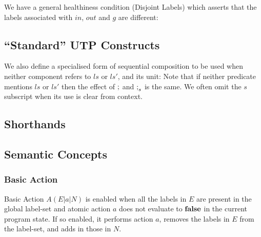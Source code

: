 We have a general healthiness condition (Disjoint Labels) which asserts
that the labels associated with $in$, $out$ and $g$
are different:


\subsection{``Standard'' UTP Constructs}

We also define a specialised form of sequential composition
to be used when neither component refers to $ls$ or $ls'$,
and its unit:
Note that if neither predicate mentions $ls$ or $ls'$
then the effect of $\mathrel{;}$ and $\mathrel{;}_s$ is the same.
We often omit the $s$ subscript when its use is clear from context.


\subsection{Shorthands}


\subsection{Semantic Concepts}

\subsubsection{Basic Action}

Basic Action $A(E|a|N)$ is enabled when all the labels in $E$
are present in the global label-set
and atomic action $a$ does not evaluate to $\mathbf{false}$
in the current program state.
If so enabled,  it performs action $a$, removes the labels in $E$
from the label-set, and adds in those in $N$.


